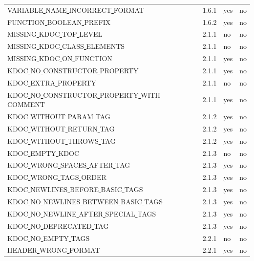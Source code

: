 \begin{longtable}{ |l|p{0.8cm}|p{0.8cm}| p{3cm} | }
VARIABLE\underline{ }NAME\underline{ }INCORRECT\underline{ }FORMAT & 1.6.1 &  yes  &   no  \\
FUNCTION\underline{ }BOOLEAN\underline{ }PREFIX & 1.6.2 &  yes  &   no  \\
MISSING\underline{ }KDOC\underline{ }TOP\underline{ }LEVEL & 2.1.1 &  no  &   no  \\
MISSING\underline{ }KDOC\underline{ }CLASS\underline{ }ELEMENTS & 2.1.1 &  no  &   no  \\
MISSING\underline{ }KDOC\underline{ }ON\underline{ }FUNCTION & 2.1.1 &  yes  &   no  \\
KDOC\underline{ }NO\underline{ }CONSTRUCTOR\underline{ }PROPERTY & 2.1.1 &  yes  &   no \\
KDOC\underline{ }EXTRA\underline{ }PROPERTY & 2.1.1 &  no  &  no   \\
KDOC\underline{ }NO\underline{ }CONSTRUCTOR\underline{ }PROPERTY\underline{ }WITH\underline{ }COMMENT & 2.1.1 &  yes  &   no \\
KDOC\underline{ }WITHOUT\underline{ }PARAM\underline{ }TAG & 2.1.2 &  yes  &   no  \\
KDOC\underline{ }WITHOUT\underline{ }RETURN\underline{ }TAG & 2.1.2 &  yes  &   no  \\
KDOC\underline{ }WITHOUT\underline{ }THROWS\underline{ }TAG & 2.1.2 &  yes  &   no  \\
KDOC\underline{ }EMPTY\underline{ }KDOC & 2.1.3 &  no  &   no  \\
KDOC\underline{ }WRONG\underline{ }SPACES\underline{ }AFTER\underline{ }TAG & 2.1.3 &  yes  &   no  \\
KDOC\underline{ }WRONG\underline{ }TAGS\underline{ }ORDER & 2.1.3 &  yes  &   no  \\
KDOC\underline{ }NEWLINES\underline{ }BEFORE\underline{ }BASIC\underline{ }TAGS & 2.1.3 &  yes  &   no  \\
KDOC\underline{ }NO\underline{ }NEWLINES\underline{ }BETWEEN\underline{ }BASIC\underline{ }TAGS & 2.1.3 &  yes  &   no  \\
KDOC\underline{ }NO\underline{ }NEWLINE\underline{ }AFTER\underline{ }SPECIAL\underline{ }TAGS & 2.1.3 &  yes  &   no  \\
KDOC\underline{ }NO\underline{ }DEPRECATED\underline{ }TAG & 2.1.3 &  yes  &   no  \\
KDOC\underline{ }NO\underline{ }EMPTY\underline{ }TAGS & 2.2.1 &  no  &   no  \\
HEADER\underline{ }WRONG\underline{ }FORMAT & 2.2.1 &  yes  &   no  \\

\end{longtable}
